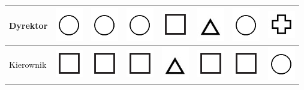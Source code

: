 \begin{table}[!ht]
\begin{tabular}{|l|c|c|c|c|c|c|c|}
  Dyrektor & \includegraphics{img/s3} & \includegraphics{img/s3} & \includegraphics{img/s3} & \includegraphics{img/s2} & \includegraphics{img/s1} & \includegraphics{img/s3} & \includegraphics{img/s4} \\ \hline
  Kierownik & \includegraphics{img/s2} & \includegraphics{img/s2} & \includegraphics{img/s2} & \includegraphics{img/s1} & \includegraphics{img/s2} & \includegraphics{img/s2} & \includegraphics{img/s3}\\ \hline

\end{tabular}
\end{table}
